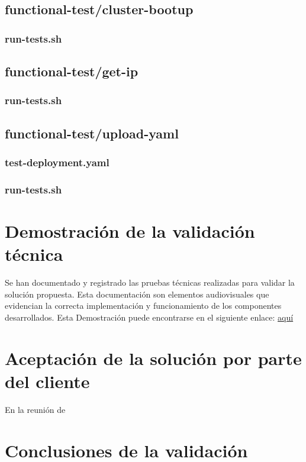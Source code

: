 \subsection{functional-test/cluster-bootup}
\noindent

\subsubsection{run-tests.sh}
\noindent




\subsection{functional-test/get-ip}
\noindent

\subsubsection{run-tests.sh}
\noindent





\subsection{functional-test/upload-yaml}

\subsubsection{test-deployment.yaml}
\noindent



\subsubsection{run-tests.sh}
\noindent



\section{Demostración de la validación técnica}
\noindent
Se han documentado y registrado las pruebas técnicas realizadas para validar la solución propuesta. Esta documentación son elementos audiovisuales que evidencian la correcta implementación y funcionamiento de los componentes desarrollados. Esta Demostración puede encontrarse en el siguiente enlace: \href{https://drive.google.com/drive/folders/1UgpmFmz7E2uYxv_FCGCpYArZDIMc0nxv?usp=sharing}{aquí}


\section{Aceptación de la solución por parte del cliente}
\noindent
En la reunión de

\section{Conclusiones de la validación}
